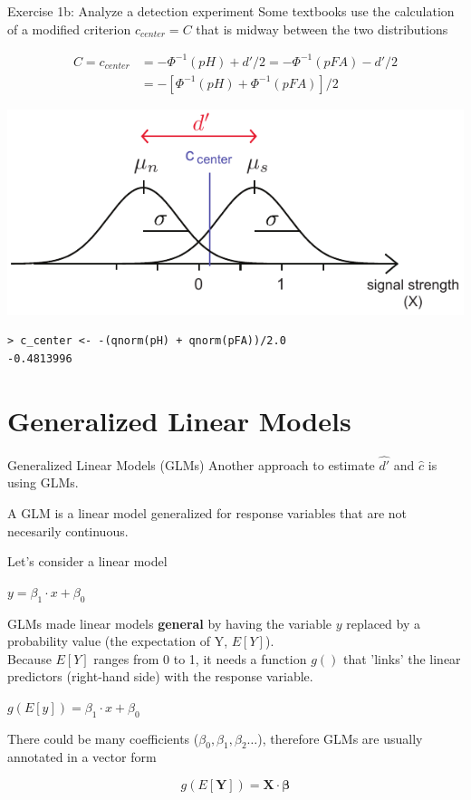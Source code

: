 \documentclass[10pt]{beamer}
\begin{document}
\begin{frame}[fragile]{Exercise 1b: Analyze a detection experiment}
Some textbooks use the calculation of a modified criterion $c_{center} = C$ that is midway between the two distributions

\begin{align*}
C = c_{center} & = -\Phi^{-1}(pH) + d'/2 = -\Phi^{-1}(pFA) - d'/2 \\
& = -[\Phi^{-1}(pH) + \Phi^{-1}(pFA)]/2 
\end{align*}

\begin{center}
\includegraphics[scale=0.8]{figs/c_center.pdf}
\end{center}

\pause
\begin{verbatim}
> c_center <- -(qnorm(pH) + qnorm(pFA))/2.0
-0.4813996
\end{verbatim}


\end{frame}

\section{Generalized Linear Models}
\begin{frame}{Generalized Linear Models (GLMs)}
Another approach to estimate $\hat{d'}$ and $\hat{c}$ is using GLMs.

A GLM is a linear model generalized for response variables that are not necesarily continuous. 

Let's consider a linear model
\begin{center}
$y = \beta_1 \cdot x + \beta_0$
\end{center}

GLMs made linear models \textbf{general} by having the variable $y$ replaced by a probability value (the expectation of Y, $E[Y]$). \\
Because $E[Y]$ ranges from 0 to 1, it needs a function $g()$ that 'links' the linear predictors (right-hand side) with the response variable.

\begin{center}
$g(E[y])= \beta_1 \cdot x + \beta_0$
\end{center}

There could be many coefficients ($\beta_0, \beta_1, \beta_2 \dots$), therefore GLMs are usually annotated in a vector form 

$$
g(E[\mathbf{Y}]) = \mathbf{X} \cdot \mathbf{\beta}
$$

\end{frame}
\end{document}
